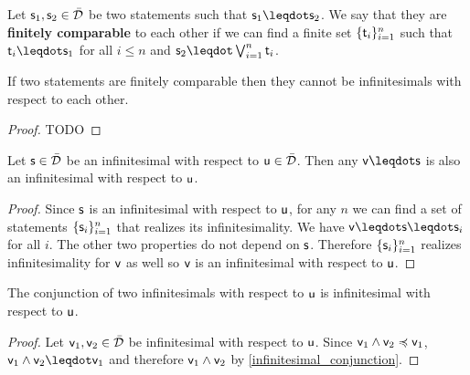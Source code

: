 \documentclass[10pt, onecolumn, longbibliography, nofootinbib]{revtex4-2}
\begin{document}
\begin{defn}
	Let $\stmt_1, \stmt_2 \in \tdomain$ be two statements such that $\stmt_1 \finer \stmt_2$. We say that they are \textbf{finitely comparable} to each other if we can find a finite set $\{ \stmt[t]_i \}_{i=1}^n$ such that $\stmt[t]_i \finer \stmt_1$ for all $i \leq n$ and $\stmt_2 \finer \bigOR_{i=1}^n \stmt[t]_i$.
\end{defn}

\begin{prop}
	If two statements are finitely comparable then they cannot be infinitesimals with respect to each other.
\end{prop}
\begin{proof}
	TODO
\end{proof} 

\begin{prop}\label{infinitesimal_conjunction}
	Let $\stmt \in \tdomain$ be an infinitesimal with respect to $\stmt[u] \in \tdomain$. Then any $\stmt[v] \finer \stmt$ is also an infinitesimal with respect to $\stmt[u]$.
\end{prop}
\begin{proof}
	Since $\stmt$ is an infinitesimal with respect to $\stmt[u]$, for any $n$ we can find a set of statements $\{ \stmt_i \}_{i=1}^n$ that realizes its infinitesimality. We have $\stmt[v] \finer \stmt \finer \stmt_i$ for all $i$. The other two properties do not depend on $\stmt$. Therefore $\{ \stmt_i \}_{i=1}^n$ realizes infinitesimality for $\stmt[v]$ as well so $\stmt[v]$ is an infinitesimal with respect to $\stmt[u]$.
\end{proof}

\begin{coro}
	The conjunction of two infinitesimals with respect to $\stmt[u]$ is infinitesimal with respect to $\stmt[u]$.
\end{coro}
\begin{proof}
	Let $\stmt[v]_1, \stmt[v]_2 \in \tdomain$ be infinitesimal with respect to $\stmt[u]$. Since $\stmt[v]_1 \AND \stmt[v]_2 \narrower \stmt[v]_1$, $\stmt[v]_1 \AND \stmt[v]_2 \finer \stmt[v]_1$ and therefore $\stmt[v]_1 \AND \stmt[v]_2$ by \ref{infinitesimal_conjunction}.
\end{proof}
\end{document}
